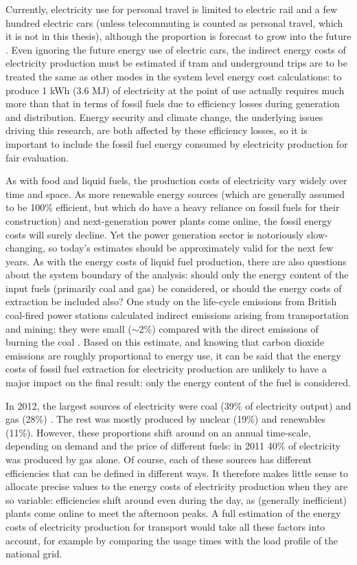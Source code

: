 Currently, electricity use for personal travel is limited to electric
rail and a few hundred electric cars (unless telecommuting is counted as
personal travel, which it is not in this thesis),
although the proportion is forecast to grow into the future \citep{Skea2010}.
Even ignoring the future energy use of electric cars, the indirect energy costs
of electricity production must be estimated if 
tram and underground trips are to be treated the same as other modes in the
system level energy cost calculations: to produce 1 kWh (3.6 MJ) of electricity
at the point of use actually requires much more than that in terms of fossil
fuels due to efficiency losses during generation and distribution. Energy
security and climate change, the underlying issues driving this research, are
both affected by these efficiency losses, so it is important to include the
fossil fuel energy consumed by electricity production for fair evaluation.

As with food and liquid fuels, the production costs of electricity vary widely
over time and space. As more renewable energy sources (which are generally
assumed to be 100\% efficient, but which do have a heavy reliance on fossil
fuels for their construction) and next-generation power plants come online,
the fossil energy costs will surely decline. Yet the power generation sector is
notoriously slow-changing, so today's estimates should be approximately valid
for the next few years. As with the energy costs of liquid fuel production,
there are also questions about the system boundary of the analysis: should only
the energy content of the input fuels (primarily coal and gas) be considered,
or should the energy costs of extraction be included also? One study on the
life-cycle emissions from British coal-fired power stations calculated indirect
emissions arising from transportation and mining: they were small ($\sim$2\%)
compared with the direct emissions of burning the coal \citep{Odeh2008212}.
Based on this estimate, and knowing that carbon dioxide emissions are roughly
proportional to energy use, it can be said that the energy costs of fossil fuel
extraction for electricity production are unlikely to have a major impact on
the final result: only the energy content of the fuel is considered.

In 2012, the largest sources of electricity were coal (39\% of electricity
output) and gas (28\%) \citep{Decc2013-elec}. The rest was mostly produced by
nuclear (19\%) and renewables (11\%). However, these proportions shift around
on an annual time-scale, depending on demand and the price of different fuels:
in 2011 40\% of electricity was produced by gas alone. Of course, each of
these sources has different efficiencies that can be defined in different ways.
It therefore makes little sense to allocate precise values to the energy costs
of electricity production when they are so variable: efficiencies shift around
even during the day, as (generally inefficient) plants come
online to meet the afternoon peaks. A full estimation of the energy costs of
electricity production for transport would take all these factors into account,
for example by comparing the usage times with the load profile of the national
grid.

